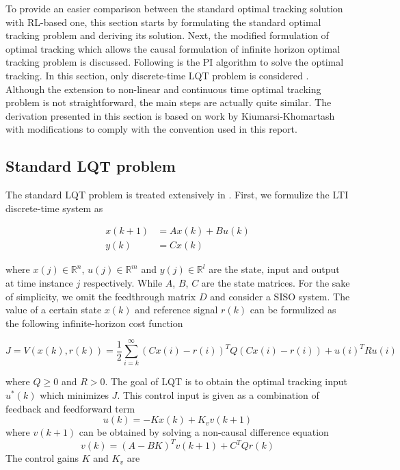 To provide an easier comparison between the standard optimal tracking solution with \ac{RL}-based one, this section starts by formulating the standard optimal tracking problem and deriving its solution. Next, the modified formulation of optimal tracking which allows the causal formulation of infinite horizon optimal tracking problem is discussed. Following is the \ac{PI} algorithm to solve the optimal tracking. In this section, only discrete-time \ac{LQT} problem is considered \cite{Kiumarsi6760476}. Although the extension to non-linear and continuous time optimal tracking problem is not straightforward, the main steps are actually quite similar. The derivation presented in this section is based on work by Kiumarsi-Khomartash \cite{Kiumarsi6760476} with modifications to comply with the convention used in this report.

\subsection{Standard LQT problem}
The standard \ac {LQT} problem is treated extensively in \cite{lewis1995optimal}. First, we formulize the \ac {LTI} discrete-time system as 

\begin{equation} \label{eq:ss}
\begin{split}
x(k+1) &= Ax(k) + Bu(k) \\
y(k) &= Cx(k)
\end{split}
\end{equation}

where $x(j) \in \mathbb{R}^n$, $u(j) \in \mathbb{R}^m$ and $y(j) \in \mathbb{R}^l$ are the state, input and output at time instance $j$ respectively. While $A$, $B$, $C$ are the state matrices. For the sake of simplicity, we omit the feedthrough matrix $D$ and consider a \ac {SISO} system. The value of a certain state $x(k)$ and reference signal $r(k)$ can be formulized as the following infinite-horizon cost function

\begin{equation}
\label{eq:infcost}
J = V(x(k), r(k)) = \frac{1}{2} \sum_{i=k}^{\infty} (Cx(i)-r(i))^TQ(Cx(i)-r(i)) + u(i)^TRu(i)
\end{equation}

where $Q \geq 0$ and $R > 0$. The goal of LQT is to obtain the optimal tracking input $u^*(k)$ which minimizes $J$. This control input is given as a combination of feedback and feedforward term
\begin{equation}
u(k) = -Kx(k) + K_vv(k+1)
\end{equation}
where $v(k+1)$ can be obtained by solving a non-causal difference equation
\begin{equation}
v(k) = (A-BK)^Tv(k+1) + C^TQr(k)
\label{eq:noncausal}
\end{equation}
The control gains $K$ and $K_v$ are

